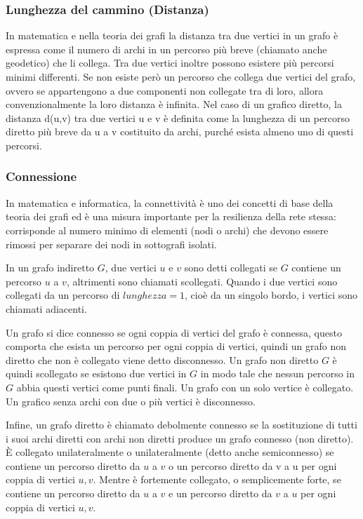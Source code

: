 \subsubsection{Lunghezza del cammino (Distanza)}
In matematica e nella teoria dei grafi la distanza tra due vertici in un grafo è espressa come il numero di archi in un percorso più breve (chiamato anche geodetico) che li collega. \cite{GrafoDistanza}
Tra due vertici inoltre possono esistere più percorsi minimi differenti. Se non esiste però un percorso che collega due vertici del grafo, ovvero se appartengono a due componenti non collegate tra di loro, allora convenzionalmente la loro distanza è infinita.
Nel caso di un grafico diretto, la distanza d(u,v) tra due vertici u e v è definita come la lunghezza di un percorso diretto più breve da u a v costituito da archi, purché esista almeno uno di questi percorsi.

\subsubsection{Connessione}
In matematica e informatica, la connettività è uno dei concetti di base della teoria dei grafi ed è una misura importante per la resilienza della rete stessa: 
corrisponde al numero minimo di elementi (nodi o archi) che devono essere rimossi per separare dei nodi in sottografi isolati. \cite{GrafoConnettivita}

In un grafo indiretto $G$, due vertici $u$ e $v$ sono detti collegati se $G$ contiene un percorso $u$ a $v$, altrimenti sono chiamati scollegati. Quando i due vertici sono collegati da un percorso di $lunghezza = 1$, cioè da un singolo bordo, i vertici sono chiamati adiacenti.

Un grafo si dice connesso se ogni coppia di vertici del grafo è connessa, questo comporta che esista un percorso per ogni coppia di vertici, quindi un grafo non diretto che non è collegato viene detto disconnesso. Un grafo non diretto $G$ è quindi scollegato se esistono due vertici in $G$ in modo tale che nessun percorso in $G$ abbia questi vertici come punti finali. Un grafo con un solo vertice è collegato. Un grafico senza archi con due o più vertici è disconnesso.

Infine, un grafo diretto è chiamato debolmente connesso se la sostituzione di tutti i suoi archi diretti con archi non diretti produce un grafo connesso (non diretto). È collegato unilateralmente o unilateralmente (detto anche semiconnesso) se contiene un percorso diretto da $u$ a $v$ o un percorso diretto da v a u per ogni coppia di vertici $u, v$. Mentre è fortemente collegato, o semplicemente forte, se contiene un percorso diretto da $u$ a $v$ e un percorso diretto da $v$ a $u$ per ogni coppia di vertici $u, v$.

